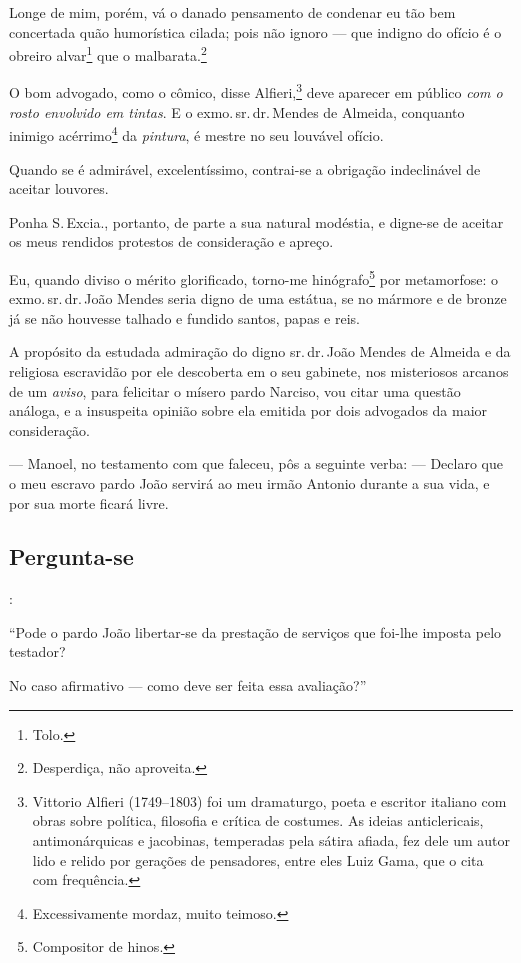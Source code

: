 Longe de mim, porém, vá o danado pensamento de condenar eu tão bem
concertada quão humorística cilada; pois não ignoro --- que indigno do
ofício é o obreiro alvar\footnote{ Tolo.} que o
malbarata.\footnote{ Desperdiça, não aproveita.}

O bom advogado, como o cômico, disse
Alfieri,\footnote{ Vittorio Alfieri (1749--1803)
  foi um dramaturgo, poeta e escritor italiano com obras sobre política,
  filosofia e crítica de costumes. As ideias anticlericais,
  antimonárquicas e jacobinas, temperadas pela sátira afiada, fez dele
  um autor lido e relido por gerações de pensadores, entre eles Luiz
  Gama, que o cita com frequência.} deve aparecer em público \emph{com o
rosto envolvido em tintas}. E o exmo.\,sr.\,dr.\,Mendes de Almeida,
conquanto inimigo acérrimo\footnote{ Excessivamente mordaz, muito
  teimoso.} da \emph{pintura}, é mestre no seu louvável ofício.

Quando se é admirável, excelentíssimo, contrai-se a obrigação
indeclinável de aceitar louvores.

Ponha S.\,Excia., portanto, de parte a sua natural modéstia, e digne-se
de aceitar os meus rendidos protestos de consideração e apreço.

Eu, quando diviso o mérito glorificado, torno-me hinógrafo\footnote{
  Compositor de hinos.} por metamorfose: o exmo.\,sr.\,dr.\,João Mendes
seria digno de uma estátua, se no mármore e de bronze já se não houvesse
talhado e fundido santos, papas e reis.

A propósito da estudada admiração do digno sr.\,dr.\,João Mendes de
Almeida e da religiosa escravidão por ele descoberta em o seu gabinete,
nos misteriosos arcanos de um \emph{aviso}, para felicitar o mísero
pardo Narciso, vou citar uma questão análoga, e a insuspeita opinião
sobre ela emitida por dois advogados da maior consideração.

--- Manoel, no testamento com que faleceu, pôs a seguinte verba: ---
Declaro que o meu escravo pardo João servirá ao meu irmão Antonio
durante a sua vida, e por sua morte ficará livre.

\subsection{Pergunta-se}:

``Pode o pardo João libertar-se da prestação de serviços que foi-lhe
imposta pelo testador?

No caso afirmativo --- como deve ser feita essa avaliação?''

